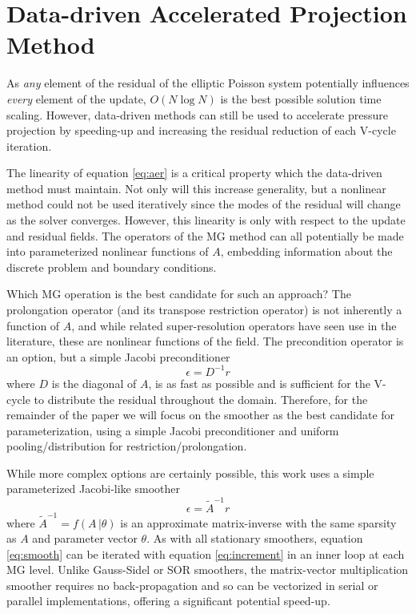 \documentclass[review]{elsarticle}
\begin{document}
\section{Data-driven Accelerated Projection Method}

As \textit{any} element of the residual of the elliptic Poisson system potentially influences \textit{every} element of the update, $O(N\log N)$ is the best possible solution time scaling. However, data-driven methods can still be used to accelerate pressure projection by speeding-up and increasing the residual reduction of each V-cycle iteration.

The linearity of equation \ref{eq:aer} is a critical property which the data-driven method must maintain. Not only will this increase generality, but a nonlinear method could not be used iteratively since the modes of the residual will change as the solver converges. However, this linearity is only with respect to the update and residual fields. The operators of the MG method can all potentially be made into parameterized nonlinear functions of $A$, embedding information about the discrete problem and boundary conditions. 

Which MG operation is the best candidate for such an approach? The prolongation operator (and its transpose restriction operator) is not inherently a function of $A$, and while related super-resolution operators have seen use in the literature, these are nonlinear functions of the field. The precondition operator is an option, but a simple Jacobi preconditioner
\begin{equation}
    \epsilon = D^{-1}r
\end{equation}
where $D$ is the diagonal of $A$, is as fast as possible and is sufficient for the V-cycle to distribute the residual throughout the domain. Therefore, for the remainder of the paper we will focus on the smoother as the best candidate for parameterization, using a simple Jacobi preconditioner and uniform pooling/distribution for restriction/prolongation.

While more complex options are certainly possible, this work uses a simple parameterized Jacobi-like smoother
\begin{equation}\label{eq:smooth}
    \epsilon = \tilde A^{-1}r
\end{equation}
where $\tilde A^{-1}=f(A\,|\theta)$ is an approximate matrix-inverse with the same sparsity as $A$ and parameter vector $\theta$. 
As with all stationary smoothers, equation \ref{eq:smooth} can be iterated with equation \ref{eq:increment} in an inner loop at each MG level. Unlike Gauss-Sidel or SOR smoothers, the matrix-vector multiplication smoother requires no back-propagation and so can be vectorized in serial or parallel implementations, offering a significant potential speed-up. 
\end{document}
